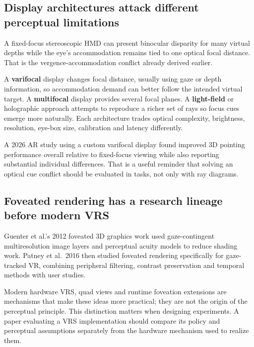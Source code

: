 \subsection{Display architectures attack different perceptual limitations}\label{04-visual-computing-ii-ch035-display-architectures-attack-different-perceptual-limitations}

\hypertarget{04-visual-computing-ii-ch035-display-architectures-attack-different-perceptual-limitations}{}

A fixed-focus stereoscopic HMD can present binocular disparity for many virtual depths while the eye's accommodation remains tied to one optical focal distance. That is the vergence-accommodation conflict already derived earlier.

A \textbf{varifocal} display changes focal distance, usually using gaze or depth information, so accommodation demand can better follow the intended virtual target. A \textbf{multifocal} display provides several focal planes. A \textbf{light-field} or holographic approach attempts to reproduce a richer set of rays so focus cues emerge more naturally. Each architecture trades optical complexity, brightness, resolution, eye-box size, calibration and latency differently.

A 2026 AR study using a custom varifocal display found improved 3D pointing performance overall relative to fixed-focus viewing while also reporting substantial individual differences. That is a useful reminder that solving an optical cue conflict should be evaluated in tasks, not only with ray diagrams.

\subsection{Foveated rendering has a research lineage before modern VRS}\label{04-visual-computing-ii-ch035-foveated-rendering-has-a-research-lineage-before-modern-vrs}

\hypertarget{04-visual-computing-ii-ch035-foveated-rendering-has-a-research-lineage-before-modern-vrs}{}

Guenter et al.'s 2012 foveated 3D graphics work used gaze-contingent multiresolution image layers and perceptual acuity models to reduce shading work. Patney et al.~2016 then studied foveated rendering specifically for gaze-tracked VR, combining peripheral filtering, contrast preservation and temporal methods with user studies.

Modern hardware VRS, quad views and runtime foveation extensions are mechanisms that make these ideas more practical; they are not the origin of the perceptual principle. This distinction matters when designing experiments. A paper evaluating a VRS implementation should compare its policy and perceptual assumptions separately from the hardware mechanism used to realize them.

